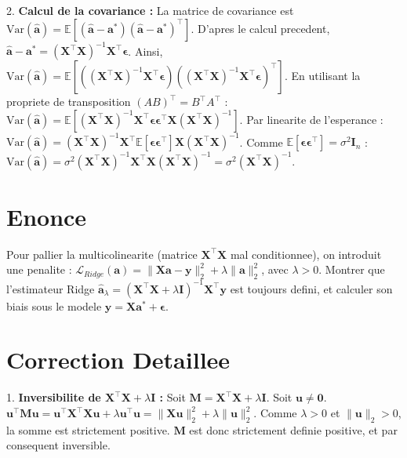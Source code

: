 \documentclass[11pt,a4paper]{report}
\begin{document}
2. \textbf{Calcul de la covariance :}
   La matrice de covariance est $\text{Var}(\hat{\mathbf{a}}) = \mathbb{E}[(\hat{\mathbf{a}} - \mathbf{a}^*)(\hat{\mathbf{a}} - \mathbf{a}^*)^\top]$.
   D'apres le calcul precedent, $\hat{\mathbf{a}} - \mathbf{a}^* = (\mathbf{X}^\top\mathbf{X})^{-1}\mathbf{X}^\top\boldsymbol{\epsilon}$.
   Ainsi, $\text{Var}(\hat{\mathbf{a}}) = \mathbb{E}[((\mathbf{X}^\top\mathbf{X})^{-1}\mathbf{X}^\top\boldsymbol{\epsilon})((\mathbf{X}^\top\mathbf{X})^{-1}\mathbf{X}^\top\boldsymbol{\epsilon})^\top]$.
   En utilisant la propriete de transposition $(AB)^\top = B^\top A^\top$ :
   $\text{Var}(\hat{\mathbf{a}}) = \mathbb{E}[(\mathbf{X}^\top\mathbf{X})^{-1}\mathbf{X}^\top \boldsymbol{\epsilon} \boldsymbol{\epsilon}^\top \mathbf{X}(\mathbf{X}^\top\mathbf{X})^{-1}]$.
   Par linearite de l'esperance :
   $\text{Var}(\hat{\mathbf{a}}) = (\mathbf{X}^\top\mathbf{X})^{-1}\mathbf{X}^\top \mathbb{E}[\boldsymbol{\epsilon} \boldsymbol{\epsilon}^\top] \mathbf{X}(\mathbf{X}^\top\mathbf{X})^{-1}$.
   Comme $\mathbb{E}[\boldsymbol{\epsilon} \boldsymbol{\epsilon}^\top] = \sigma^2 \mathbf{I}_n$ :
   $\text{Var}(\hat{\mathbf{a}}) = \sigma^2 (\mathbf{X}^\top\mathbf{X})^{-1}\mathbf{X}^\top \mathbf{X}(\mathbf{X}^\top\mathbf{X})^{-1} = \sigma^2 (\mathbf{X}^\top\mathbf{X})^{-1}$.

\section{Enonce}
Pour pallier la multicolinearite (matrice $\mathbf{X}^\top\mathbf{X}$ mal conditionnee), on introduit une penalite : $\mathcal{L}_{Ridge}(\mathbf{a}) = \|\mathbf{X}\mathbf{a} - \mathbf{y}\|_2^2 + \lambda \|\mathbf{a}\|_2^2$, avec $\lambda > 0$.
Montrer que l'estimateur Ridge $\hat{\mathbf{a}}_\lambda = (\mathbf{X}^\top\mathbf{X} + \lambda \mathbf{I})^{-1}\mathbf{X}^\top\mathbf{y}$ est toujours defini, et calculer son biais sous le modele $\mathbf{y} = \mathbf{X}\mathbf{a}^* + \boldsymbol{\epsilon}$.

\section{Correction Detaillee}
1. \textbf{Inversibilite de $\mathbf{X}^\top\mathbf{X} + \lambda \mathbf{I}$ :}
   Soit $\mathbf{M} = \mathbf{X}^\top\mathbf{X} + \lambda \mathbf{I}$. Soit $\mathbf{u} \neq \mathbf{0}$.
   $\mathbf{u}^\top\mathbf{M}\mathbf{u} = \mathbf{u}^\top\mathbf{X}^\top\mathbf{X}\mathbf{u} + \lambda \mathbf{u}^\top\mathbf{u} = \|\mathbf{X}\mathbf{u}\|_2^2 + \lambda \|\mathbf{u}\|_2^2$.
   Comme $\lambda > 0$ et $\|\mathbf{u}\|_2 > 0$, la somme est strictement positive.
   $\mathbf{M}$ est donc strictement definie positive, et par consequent inversible.
\end{document}
